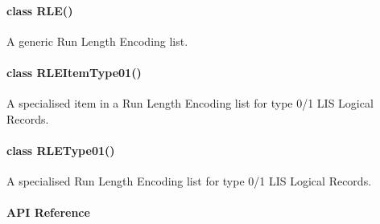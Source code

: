 \documentclass[letterpaper,10pt,english]{sphinxmanual}
\begin{document}
\paragraph{class RLE()}
\label{\detokenize{ref/LIS/core/Rle:class-rle}}
A generic Run Length Encoding list.


\paragraph{class RLEItemType01()}
\label{\detokenize{ref/LIS/core/Rle:class-rleitemtype01}}
A specialised item in a Run Length Encoding list for type 0/1 LIS Logical Records.


\paragraph{class RLEType01()}
\label{\detokenize{ref/LIS/core/Rle:class-rletype01}}
A specialised Run Length Encoding list for type 0/1 LIS Logical Records.


\paragraph{API Reference}
\label{\detokenize{ref/LIS/core/Rle:api-reference}}
\end{document}
